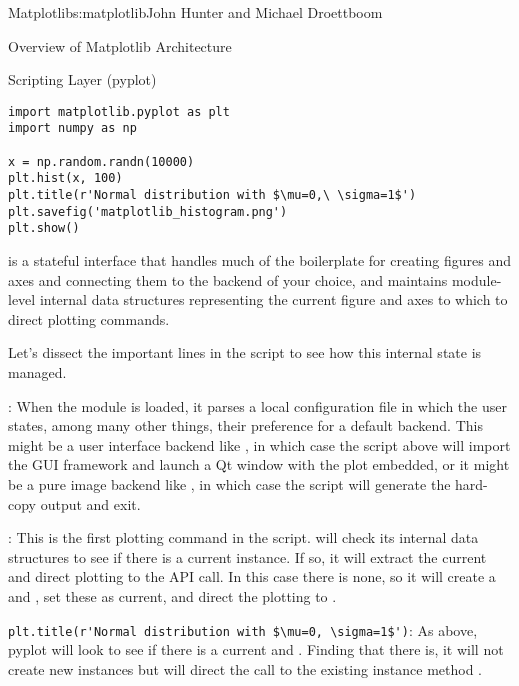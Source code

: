 \begin{aosachapter}{Matplotlib}{s:matplotlib}{John Hunter and Michael Droettboom}
\begin{aosasect1}{Overview of Matplotlib Architecture}
\begin{aosasect2}{Scripting Layer (pyplot)}
\begin{verbatim}
import matplotlib.pyplot as plt
import numpy as np

x = np.random.randn(10000)
plt.hist(x, 100)
plt.title(r'Normal distribution with $\mu=0,\ \sigma=1$')
plt.savefig('matplotlib_histogram.png')
plt.show()
\end{verbatim}


 is a stateful interface that handles much of the boilerplate
for creating figures and axes and connecting them to the backend of
your choice, and maintains module-level internal data structures
representing the current figure and axes to which to direct plotting
commands.

Let's dissect the important lines in the script to see how this
internal state is managed.

\begin{aosaitemize}

\item {}: When the  module
  is loaded, it parses a local configuration file in which the user
  states, among many other things, their preference for a default
  backend.  This might be a user interface backend like ,
  in which case the script above will import the GUI framework and
  launch a Qt window with the plot embedded, or it might be a pure
  image backend like , in which case the script will
  generate the hard-copy output and exit.

\item {}: This is the first plotting command in
  the script.   will check its internal data structures to see
  if there is a current  instance.  If so, it will
  extract the current  and direct plotting to the
   API call.  In this case there is none, so it will
  create a  and , set these as current, and
  direct the plotting to .

\item \verb+plt.title(r'Normal distribution with $\mu=0, \sigma=1$')+:
  As above, pyplot will look to see if there is a
  current  and .  Finding that there is, it
  will not create new instances but will direct the call to the
  existing  instance method .


\end{aosaitemize}
\end{aosasect2}
\end{aosasect1}
\end{aosachapter}
